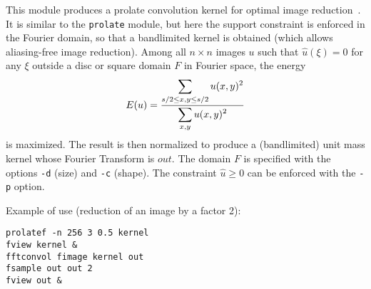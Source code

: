 This module produces a prolate convolution kernel for optimal
image reduction~\cite{landau.pollak:prolate}. 
It is similar to the \verb+prolate+ module, but here
the support constraint is enforced in
the Fourier domain, so that a bandlimited kernel is obtained 
(which allows aliasing-free image reduction).
Among all $n\times n$ images $u$ such that 
$\hat u(\xi)=0$ for any $\xi$ outside a disc or square 
domain $F$ in Fourier space, the energy 
$$E(u) = \frac{\displaystyle \sum_{\-s/2\leq x,y \leq s/2} u(x,y)^2}
{\displaystyle \sum_{x,y} u(x,y)^2}$$
is maximized. The result is then normalized to produce a (bandlimited)
unit mass kernel whose Fourier Transform is $out$.
The domain $F$ is specified with the options \verb+-d+ (size) and 
\verb+-c+ (shape). The constraint $\hat u \geq 0$ can be enforced 
with the \verb+-p+ option.

\medskip

Example of use (reduction of an image by a factor 2):

\begin{verbatim}
prolatef -n 256 3 0.5 kernel
fview kernel &
fftconvol fimage kernel out
fsample out out 2
fview out &
\end{verbatim}
